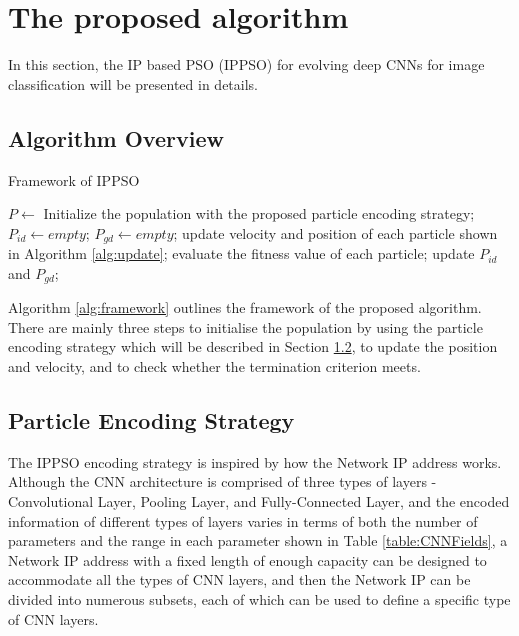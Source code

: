 \documentclass[conference]{IEEEtran}
\begin{document}
\section{The proposed algorithm}\label{sec:ProposedAlgorithm}
In this section, the IP based PSO (IPPSO) for evolving deep CNNs for image classification will be presented in details. 


\subsection{Algorithm Overview}
\begin{algorithm}
	\caption{Framework of IPPSO}
	\label{alg:framework}
	\begin{algorithmic}
		\renewcommand{\algorithmicrequire}{\textbf{Input:}}
		\renewcommand{\algorithmicensure}{\textbf{Output:}}
		\STATE $P \leftarrow$ Initialize the population with the proposed particle encoding strategy;
		\STATE $P_{id} \leftarrow empty$;
		\STATE $P_{gd} \leftarrow empty$;
			\STATE update velocity and position of each particle shown in Algorithm \ref{alg:update};
			\STATE evaluate the fitness value of each particle;
			\STATE update $P_{id}$ and $P_{gd}$;
		\ENDWHILE		
	\end{algorithmic}
\end{algorithm}

Algorithm \ref{alg:framework} outlines the framework of the proposed algorithm. There are mainly three steps to initialise the population by using the particle encoding strategy which will be described in Section \ref{sec:ParticleEncodingStrategy}, to update the position and velocity, and to check whether the termination criterion meets.

\subsection{Particle Encoding Strategy}\label{sec:ParticleEncodingStrategy}

The IPPSO encoding strategy is inspired by how the Network IP address works. Although the CNN architecture is comprised of three types of layers - Convolutional Layer, Pooling Layer, and Fully-Connected Layer, and the encoded information of different types of layers varies in terms of both the number of parameters and the range in each parameter shown in Table \ref{table:CNNFields}, a Network IP address with a fixed length of enough capacity can be designed to accommodate all the types of CNN layers, and then the Network IP can be divided into numerous subsets, each of which can be used to define a specific type of CNN layers. 
\end{document}
